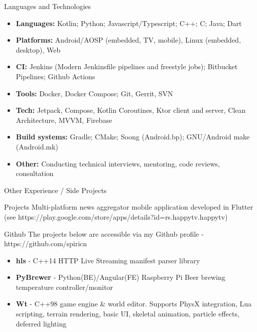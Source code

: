 \documentclass[]{mcdowellcv}
\begin{document}
	\begin{cvsection}{Languages and Technologies}
		\begin{cvsubsection}{}{}{}
			\begin{itemize}
				\item \textbf{Languages:} Kotlin; Python; Javascript/Typescript; C++; C; Java; Dart
				\item \textbf{Platforms:} Android/AOSP (embedded, TV, mobile), Linux (embedded, desktop), Web
				\item \textbf{CI:} Jenkins (Modern Jenkinsfile pipelines and freestyle jobs); Bitbucket Pipelines; Github Actions
				\item \textbf{Tools:} Docker, Docker Compose; Git, Gerrit, SVN
				\item \textbf{Tech:} Jetpack, Compose, Kotlin Coroutines, Ktor client and server, Clean Architecture, MVVM, Firebase
				\item \textbf{Build systems:} Gradle; CMake; Soong (Android.bp); GNU/Android make (Android.mk)
				\item \textbf{Other:} Conducting technical interviews, mentoring, code reviews, consultation
			\end{itemize}
		\end{cvsubsection}
	\end{cvsection}

	\begin{cvsection}{Other Experience / Side Projects}
		\begin{cvsubsection}{Projects}{}{}
			Multi-platform news aggregator mobile application developed in Flutter (see https://play.google.com/store/apps/details?id=rs.happytv.happytv)
		\end{cvsubsection}

		\begin{cvsubsection}{Github}{}{}
			The projects below are accessible via my Github profile - https://github.com/spiricn
			\begin{itemize}
				\item \textbf{hls} - C++14 HTTP Live Streaming manifest parser library
				\item \textbf{PyBrewer} - Python(BE)/Angular(FE) Raspberry Pi Beer brewing temperature controller/monitor
				\item \textbf{Wt} - C++98 game engine \& world editor. Supports PhysX integration, Lua scripting, terrain rendering, basic UI, skeletal animation, particle effects, deferred lighting
			\end{itemize}

		\end{cvsubsection}
	\end{cvsection}
\end{document}
